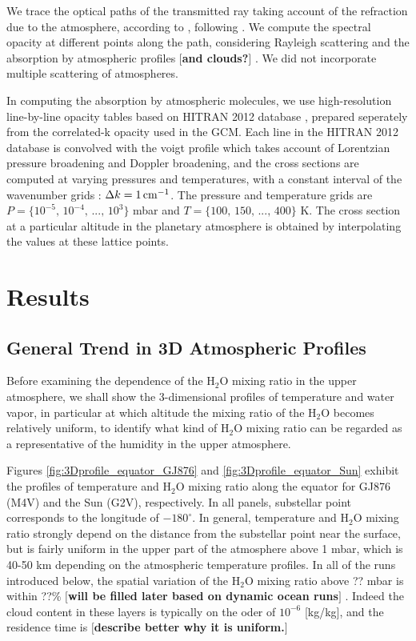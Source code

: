 \documentclass[11pt,numberedappendix,twocolappendix,]{emulateapj}
\def\water{H$_2$O }
\def\memo#1{\color{red}$[${\bf #1}$]$ \color{black}}
\begin{document}
We trace the optical paths of the transmitted ray taking account of the refraction due to the atmosphere, according to \citet{vanderWerf2008}, following \citet{Misra2014}. 
We compute the spectral opacity at different points along the path, considering Rayleigh scattering and the absorption by atmospheric profiles \memo{and clouds?}. 
We did not incorporate multiple scattering of atmospheres. 

In computing the absorption by atmospheric molecules, we use high-resolution line-by-line opacity tables based on HITRAN 2012 database \citep{Rothman2013}, prepared seperately from the correlated-k opacity used in the GCM. 
Each line in the HITRAN 2012 database is convolved with the voigt profile which takes account of Lorentzian pressure broadening and Doppler broadening, 
and the cross sections are computed at varying pressures and temperatures, with a constant interval of the wavenumber grids : $\Delta k = 1\,{\rm cm}^{-1}$. 
The pressure and temperature grids are $P = \{10^{-5},\, 10^{-4},\,...,\,10^3\}$ mbar and $T = \{100,\, 150,\,...,\, 400\}$ K. 
The cross section at a particular altitude in the planetary atmosphere is obtained by interpolating the values at these lattice points. 


\section{Results}
\label{s:results}

\subsection{General Trend in 3D Atmospheric Profiles}
\label{ss:result_H2Omixingratio}

Before examining the dependence of the \water mixing ratio in the upper atmosphere, we shall show the 3-dimensional profiles of temperature and water vapor, in particular at which altitude the mixing ratio of the \water becomes relatively uniform, to identify what kind of \water mixing ratio can be regarded as a representative of the humidity in the upper atmosphere. 

Figures \ref{fig:3Dprofile_equator_GJ876} and \ref{fig:3Dprofile_equator_Sun} exhibit the profiles of temperature and \water mixing ratio along the equator  for GJ876 (M4V) and the Sun (G2V), respectively.  
In all panels, substellar point corresponds to the longitude of $-180^{\circ }$. 
In general, temperature and \water mixing ratio strongly depend on the distance from the substellar point near the surface, but is fairly uniform in the upper part of the atmosphere above 1 mbar, which is 40-50 km depending on the atmospheric temperature profiles. 
In all of the runs introduced below, the spatial variation of the \water mixing ratio above ?? mbar is within ??\% \memo{will be filled later based on dynamic ocean runs}. 
Indeed the cloud content in these layers is typically on the oder of $10^{-6} $ [kg/kg], and the residence time is \memo{describe better why it is uniform.}
\end{document}
